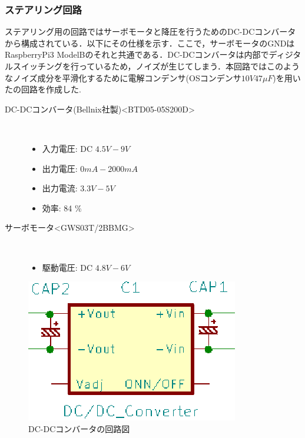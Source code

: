 \newpage

\subsubsection{ステアリング回路}
ステアリング用の回路ではサーボモータと降圧を行うためのDC-DCコンバータから構成されている．以下にその仕様を示す．ここで，サーボモータのGNDはRaspberryPi3 ModelBのそれと共通である．DC-DCコンバータは内部でディジタルスイッチングを行っているため，ノイズが生じてしまう\cite{dcdc}．本回路ではこのようなノイズ成分を平滑化するために電解コンデンサ(OSコンデンサ$10\unit{V}47\unit{\mu F}$)を用いたの回路を作成した\cite{dcdcconverter}.

\begin{description}
    \item[DC-DCコンバータ(Bellnix社製)\textless BTD05-05S200D\textgreater \cite{dcdcconverter}]\mbox{}\\
    \vspace{-5mm}
        \begin{itemize}
            \item 入力電圧: DC $4.5\unit{V}-9\unit{V}$
            \item 出力電圧: $0\unit{mA}-2000\unit{mA}$
            \item 出力電流: $3.3\unit{V}-5\unit{V}$
            \item 効率: 84 \%
        \end{itemize}
     \item[サーボモータ\textless GWS03T/2BBMG\textgreater]\mbox{}\\
    \vspace{-5mm}
         \begin{itemize}
            \item 駆動電圧: DC $4.8\unit{V}-6\unit{V}$
        \end{itemize}
\end{description}


\begin{figure}[h]
\centering
\includegraphics[scale=0.8]{picture/eps/dcdc_unit.eps}
\caption{DC-DCコンバータの回路図}
\label{fig::dcdc_unit}
\end{figure}
